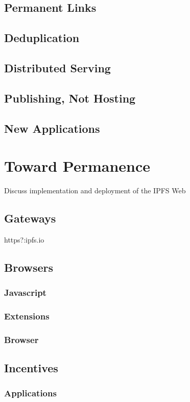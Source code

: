 \documentclass{sig-alternate}
\begin{document}
\subsection{Permanent Links}
\subsection{Deduplication}
\subsection{Distributed Serving}
\subsection{Publishing, Not Hosting}
\subsection{New Applications}

\section{Toward Permanence}

Discuss implementation and deployment of the IPFS Web

\subsection{Gateways}

https?:\/\/ipfs.io\/<ipfs-path>

\subsection{Browsers}
\subsubsection{Javascript}
\subsubsection{Extensions}
\subsubsection{Browser}

\subsection{Incentives}
\subsubsection{Applications}
\end{document}
